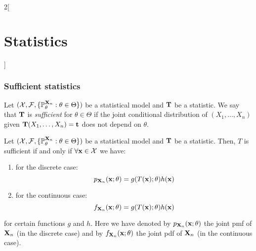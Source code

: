 \documentclass[../../../main.tex]{subfiles}
\begin{document}
\begin{multicols}{2}[\section{Statistics}]
  \subsubsection{Sufficient statistics}
  \begin{definition}
    Let $(\mathcal{X},\mathcal{F},\{\mathbb{P}_\theta^{\boldsymbol{\mathrm{X}}_n}:\theta\in\Theta\})$ be a statistical model and $\boldsymbol{\mathrm{T}}$ be a statistic. We say that $\boldsymbol{\mathrm{T}}$ is \emph{sufficient} for $\theta\in\Theta$ if the joint conditional distribution of $(X_1,\ldots,X_n)$ given $\boldsymbol{\mathrm{T}}(X_1,\ldots,X_n)=\boldsymbol{\mathrm{t}}$ does not depend on $\theta$.
  \end{definition}
  \begin{theorem}
    Let $(\mathcal{X},\mathcal{F},\{\mathbb{P}_\theta^{\boldsymbol{\mathrm{X}}_n}:\theta\in\Theta\})$ be a statistical model and $\boldsymbol{\mathrm{T}}$ be a statistic. Then, $T$ is sufficient if and only if $\forall \boldsymbol{\mathrm{x}}\in\mathcal{X}$ we have:
    \begin{enumerate}
      \item for the discrete case: $$p_{\boldsymbol{\mathrm{X}}_n}(\boldsymbol{\mathrm{x}};\theta)=g(T(\boldsymbol{\mathrm{x}});\theta)h(\boldsymbol{\mathrm{x}})$$
      \item for the continuous case:  $$f_{\boldsymbol{\mathrm{X}}_n}(\boldsymbol{\mathrm{x}};\theta)=g(T(\boldsymbol{\mathrm{x}});\theta)h(\boldsymbol{\mathrm{x}})$$
    \end{enumerate}
    for certain functions $g$ and $h$. Here we have denoted by $p_{\boldsymbol{\mathrm{X}}_n}(\boldsymbol{\mathrm{x}};\theta)$ the joint pmf of $\boldsymbol{\mathrm{X}}_n$ (in the discrete case) and by $f_{\boldsymbol{\mathrm{X}}_n}(\boldsymbol{\mathrm{x}};\theta)$ the joint pdf of $\boldsymbol{\mathrm{X}}_n$ (in the continuous case).
  \end{theorem}

\end{multicols}
\end{document}

